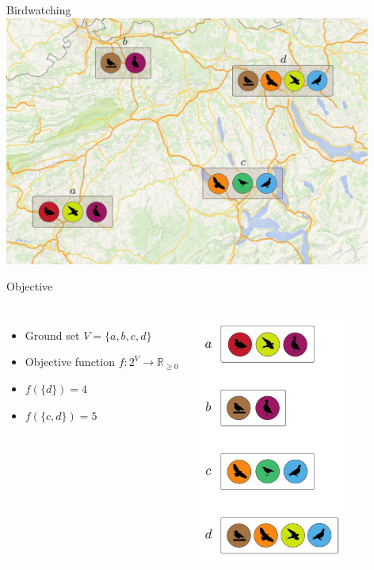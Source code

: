 \documentclass[xetex,10pt,mathserif]{beamer}
\begin{document}
\begin{frame}{Birdwatching}
\centering
\includegraphics[width=4.75in]{figures/intro_2.pdf}
\end{frame}

\begin{frame}{Objective}
\begin{columns}[c]
\begin{itemize}
\item<2-> Ground set $V = \{a, b, c, d\}$
\vspace{2em}
\item<3-> Objective function $f : 2^V \to \mathbb{R}_{\geq 0}$
\vspace{2em}
\item<4-> $f(\{d\}) = 4$
\vspace{2em}
\item<5-> $f(\{c, d\}) = 5$
\end{itemize}
\centering
\includegraphics[width=2in]{figures/sets.pdf}
\end{columns}
\end{frame}
\end{document}
